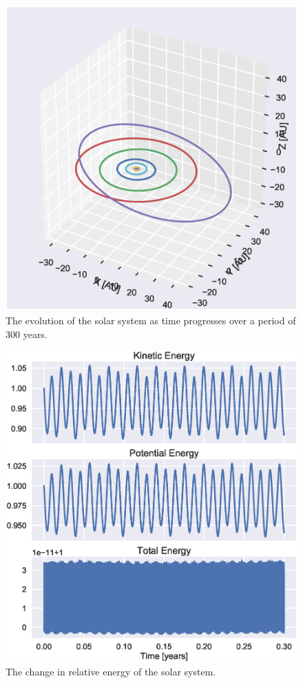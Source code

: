\documentclass[aps,reprint]{revtex4-1}
\begin{document}
\begin{figure}[H]
  \centering
  \includegraphics[width=\columnwidth]{figures/fullsystem.eps}
  \caption{\label{fig:fullsystem} The evolution of the solar system as time
    progresses over a period of \(300\) years.}
\end{figure}

\begin{figure}[H]
  \centering
  \includegraphics[width=\columnwidth]{figures/fullsystem_energy.eps}
  \caption{\label{fig:fullsystemenergy} The change in relative energy
    of the solar system.}
\end{figure}
\end{document}

